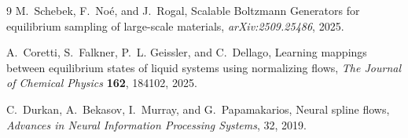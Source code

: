 \documentclass[11pt,a4paper]{article}
\begin{document}
\begin{thebibliography}{9}
M.~Schebek, F.~No\'e, and J.~Rogal,
\newblock Scalable Boltzmann Generators for equilibrium sampling of
large-scale materials,
\newblock \emph{arXiv:2509.25486}, 2025.

A.~Coretti, S.~Falkner, P.~L. Geissler, and C.~Dellago,
\newblock Learning mappings between equilibrium states of liquid systems using
normalizing flows,
\newblock \emph{The Journal of Chemical Physics} \textbf{162}, 184102, 2025.

C.~Durkan, A.~Bekasov, I.~Murray, and G.~Papamakarios,
\newblock Neural spline flows,
\newblock \emph{Advances in Neural Information Processing Systems}, 32, 2019.
\end{thebibliography}
\end{document}
